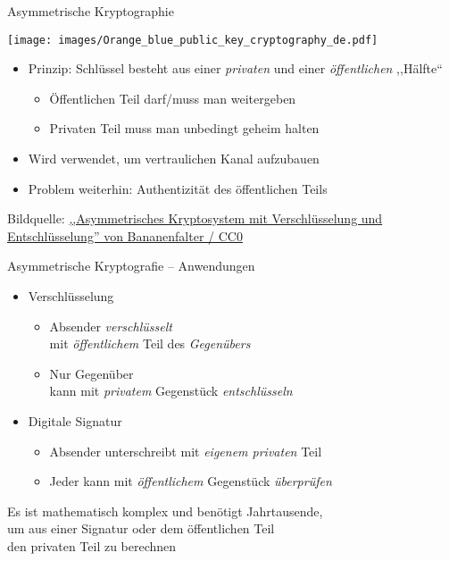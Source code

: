 \begin{frame}{Asymmetrische Kryptographie}
  \begin{center}
    \texttt{[image: images/Orange\_blue\_public\_key\_cryptography\_de.pdf]}
  \end{center}
  \begin{itemize}
    \item Prinzip: Schlüssel besteht aus einer \emph{privaten} und einer \emph{öffentlichen} ,,Hälfte``
    \begin{itemize}
      \item Öffentlichen Teil darf/muss man weitergeben
      \item Privaten Teil muss man unbedingt geheim halten
    \end{itemize}
    \item Wird verwendet, um vertraulichen Kanal aufzubauen
    \item Problem weiterhin: Authentizität des öffentlichen Teils
  \end{itemize}
  \tiny Bildquelle: \href{https://commons.wikimedia.org/wiki/File:Orange_blue_public_key_cryptography_de.svg}{,,Asymmetrisches Kryptosystem mit Verschlüsselung und Entschlüsselung'' von Bananenfalter / CC0}
\end{frame}

\begin{frame}{Asymmetrische Kryptografie -- Anwendungen}
  \begin{itemize}
    \item Verschlüsselung
      \begin{itemize}
        \item Absender \emph{verschlüsselt}\\ mit \emph{öffentlichem} Teil des \emph{Gegenübers}
        \item Nur Gegenüber\\ kann mit \emph{privatem} Gegenstück \emph{entschlüsseln}
      \end{itemize}
    \item Digitale Signatur
      \begin{itemize}
        \item Absender unterschreibt mit \emph{eigenem privaten} Teil
        \item Jeder kann mit \emph{öffentlichem} Gegenstück \emph{überprüfen}
      \end{itemize}
  \end{itemize}
  Es ist mathematisch komplex und benötigt Jahrtausende,\\ um aus einer Signatur oder dem öffentlichen Teil\\ den privaten Teil zu berechnen
\end{frame}

\endinput

